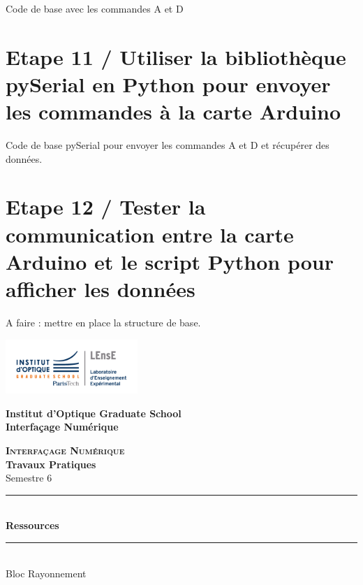 \documentclass[a4paper,11pt,titlepage]{article} %
\begin{document}
Code de base avec les commandes A et D

\section{Etape 11 / Utiliser la bibliothèque pySerial en Python pour envoyer les commandes à la carte Arduino}

Code de base pySerial pour envoyer les commandes A et D et récupérer des données.

\section{Etape 12 / Tester la communication entre la carte Arduino et le script Python pour afficher les données}

A faire : mettre en place la structure de base.







\newpage
\begin{center}
	\begin{minipage}{2.5cm}
	\begin{center}
		\includegraphics[width=5cm]{images/Logo-LEnsE.png}
	\end{center}
\end{minipage}\hfill
\begin{minipage}{10cm}
	\begin{center}
	\textbf{Institut d'Optique Graduate School }\\[0.1cm]
    \textbf{Interfaçage Numérique}


	\end{center}
\end{minipage}\hfill


\vspace{2cm}


{\Large \bfseries \textsc{Interfaçage Numérique}} \\[0.5cm]
{\large \bfseries Travaux Pratiques} \\[0.2cm]
Semestre 6

\vspace{1cm}

\rule{\linewidth}{0.4mm} \\[0.4cm]
{ \Large \bfseries\color{violet_iogs} Ressources \\[0.4cm] }
\rule{\linewidth}{0.4mm} \\[1cm]
{\large Bloc Rayonnement}

\end{center}
\end{document}
